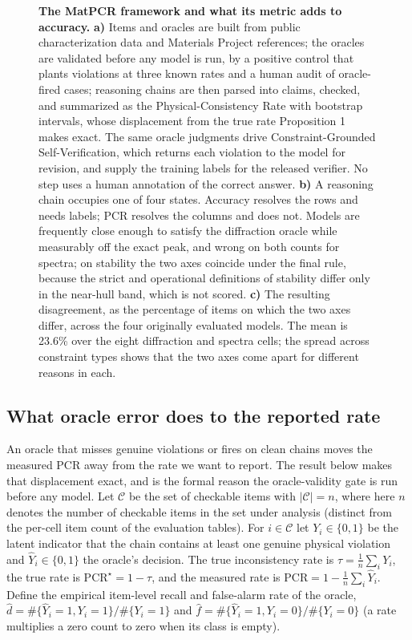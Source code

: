 \documentclass[pdflatex,sn-nature]{sn-jnl}
\newcommand{\rev}[1]{#1}
\newcommand{\rev}[1]{{\color{blue}#1}}
\begin{document}
\begin{figure}[p]
\caption{\justifying\textbf{The MatPCR framework and what its metric adds to accuracy.} \textbf{a)} Items and oracles are built from public characterization data and Materials Project references; the oracles are validated before any model is run, by a positive control that plants violations at three known rates and a human audit of oracle-fired cases; reasoning chains are then parsed into claims, checked, and summarized as the Physical-Consistency Rate with bootstrap intervals, whose displacement from the true rate Proposition 1 makes exact. The same oracle judgments drive Constraint-Grounded Self-Verification, which returns each violation to the model for revision, and supply the training labels for the released verifier. No step uses a human annotation of the correct answer. \textbf{b)} A reasoning chain occupies one of four states. Accuracy resolves the rows and needs labels; PCR resolves the columns and does not. \rev{Models are frequently close enough to satisfy the diffraction oracle while measurably off the exact peak, and wrong on both counts for spectra; on stability the two axes coincide under the final rule, because the strict and operational definitions of stability differ only in the near-hull band, which is not scored.} \textbf{c)} The resulting disagreement, as the percentage of items on which the two axes differ, across the four originally evaluated models. \rev{The mean is 23.6\% over the eight diffraction and spectra cells}; the spread across constraint types shows that the two axes come apart for different reasons in each.}
\label{fig:pipeline}
\end{figure}

\subsection*{What oracle error does to the reported rate}
An oracle that misses genuine violations or fires on clean chains moves the measured PCR away
from the rate we want to report. The result below makes that displacement exact, and is the
formal reason the oracle-validity gate is run before any model. Let
$\mathcal{C}$ be the set of checkable items with $|\mathcal{C}|=n$, where here $n$ denotes
the number of checkable items in the set under analysis (distinct from the per-cell item
count of the evaluation tables). For
$i\in\mathcal{C}$ let $Y_i\in\{0,1\}$ be the latent indicator that the chain contains
at least one genuine physical violation and $\hat Y_i\in\{0,1\}$ the oracle's decision.
The true inconsistency rate is $\tau=\frac1n\sum_i Y_i$, the true rate is
$\mathrm{PCR}^\star=1-\tau$, and the measured rate is
$\mathrm{PCR}=1-\frac1n\sum_i\hat Y_i$. Define the empirical item-level recall and
false-alarm rate of the oracle,
$\hat d=\#\{\hat Y_i{=}1,Y_i{=}1\}/\#\{Y_i{=}1\}$ and
$\hat f=\#\{\hat Y_i{=}1,Y_i{=}0\}/\#\{Y_i{=}0\}$ (a rate multiplies a zero
count to zero when its class is empty).
\end{document}
